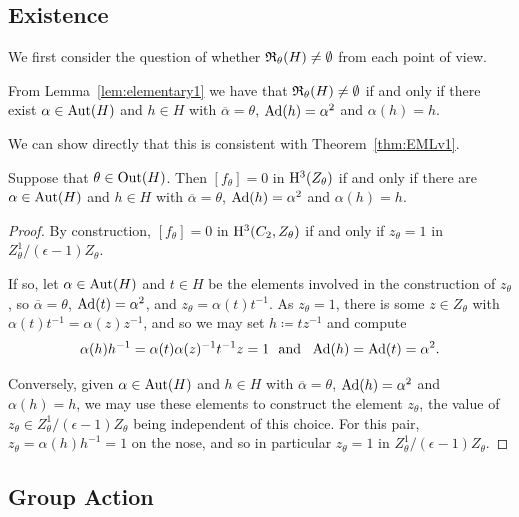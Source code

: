 \subsection{Existence}

We first consider the question of whether ${\mathfrak R}_{\theta}(H) \neq \emptyset$ from each point of view.

From Lemma~\ref{lem:elementary1} we have that ${\mathfrak R}_{\theta}(H) \neq \emptyset$ if and only if there exist $\alpha \in \operatorname{Aut}(H)$ and $h \in H$ with $\overline{\alpha} = \theta$, $\operatorname{Ad}(h) = \alpha^2$ and $\alpha(h) = h$. 

We can show directly that this is consistent with Theorem~\ref{thm:EMLv1}. %

\begin{lemma}\label{lem:deg3cohom}
    Suppose that $\theta \in \operatorname{Out}(H)$. Then $[f_{\theta}] = 0$ in $\mathrm{H}^3(Z_{\theta})$ if and only if there are $\alpha \in \operatorname{Aut}(H)$ and $h \in H$ with $\overline{\alpha} = \theta$, $\operatorname{Ad}(h) = \alpha^2$ and $\alpha(h) = h$.
\end{lemma}

\begin{proof}
  By construction, $[f_{\theta}] = 0$ in $\mathrm{H}^3(C_2, Z_{\theta})$ if and only if $z_{\theta} = 1$ in $Z_{\theta}^1 / (\epsilon - 1) Z_{\theta}$.

  If so, let $\alpha \in \operatorname{Aut}(H)$ and $t \in H$ be the elements involved in the construction of $z_{\theta}$, so $\overline{\alpha} = \theta$, $\operatorname{Ad}(t) = \alpha^2$, and $z_{\theta} = \alpha(t)t^{-1}$. As $z_{\theta} = 1$, there is some $z \in Z_{\theta}$ with $\alpha(t)t^{-1} = \alpha(z) z^{-1}$, and so we may set $h \coloneqq tz^{-1}$ and compute
    \[
        \alpha(h)h^{-1} = \alpha(t)\alpha(z)^{-1}t^{-1} z = 1 \ 
        \mbox{ and } \ \Ad(h) = \Ad(t) = \alpha^2.
    \]

    Conversely, given $\alpha \in \operatorname{Aut}(H)$ and $h \in H$ with $\overline{\alpha} = \theta$, $\operatorname{Ad}(h) = \alpha^2$ and $\alpha(h) = h$, we may use these elements to construct the element $z_{\theta}$, the value of $z_{\theta} \in Z_{\theta}^1 / (\epsilon - 1) Z_{\theta}$ being independent of this choice. For this pair, $z_{\theta} = \alpha(h)h^{-1} = 1$ on the nose, and so in particular $z_{\theta} = 1$ in $Z_{\theta}^1 / (\epsilon - 1) Z_{\theta}$.
\end{proof}

\subsection{Group Action}\label{sect:freetransgroupaction}

